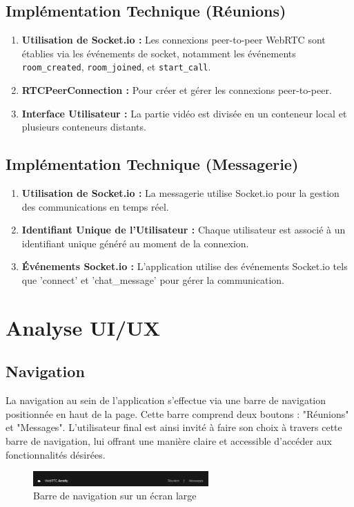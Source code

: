 \documentclass[12pt, a4paper, oneside]{thesis}
\begin{document}
\subsection{Implémentation Technique (Réunions)}
\begin{enumerate}
    \item \textbf{Utilisation de Socket.io :} Les connexions peer-to-peer WebRTC sont établies via les événements de socket, notamment les événements \texttt{room\_created}, \texttt{room\_joined}, et \texttt{start\_call}.
    \item \textbf{RTCPeerConnection :} Pour créer et gérer les connexions peer-to-peer.
    \item \textbf{Interface Utilisateur :} La partie vidéo est divisée en un conteneur local et plusieurs conteneurs distants.
\end{enumerate}

\subsection{Implémentation Technique (Messagerie)}
\begin{enumerate}
    \item \textbf{Utilisation de Socket.io :} La messagerie utilise Socket.io pour la gestion des communications en temps réel.
    \item \textbf{Identifiant Unique de l'Utilisateur :} Chaque utilisateur est associé à un identifiant unique généré au moment de la connexion.
    \item \textbf{Événements Socket.io :} L'application utilise des événements Socket.io tels que 'connect' et 'chat\_message' pour gérer la communication.
\end{enumerate}

\section{Analyse UI/UX}
\subsection{Navigation}
La navigation au sein de l'application s'effectue via une barre de navigation positionnée en haut de la page. Cette barre comprend deux boutons : "Réunions" et "Messages". L'utilisateur final est ainsi invité à faire son choix à travers cette barre de navigation, lui offrant une manière claire et accessible d'accéder aux fonctionnalités désirées.

\begin{figure}[h]
    \centering
    \includegraphics[width=0.6\textwidth]{images/NavBarPC.png}
    \caption{Barre de navigation sur un écran large}
\end{figure}
\end{document}
